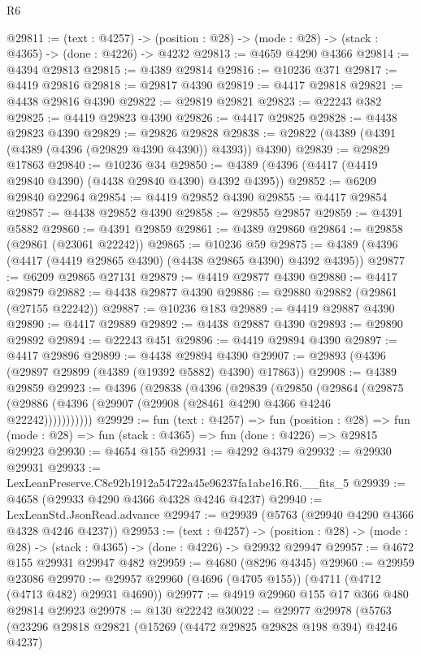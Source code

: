\begin{lexlean}{R6}
\begin{coremodule}
@29811 := (text : @4257) ->
  (position : @28) -> (mode : @28) -> (stack : @4365) -> (done : @4226) -> @4232
@29813 := @4659 @4290 @4366
@29814 := @4394 @29813
@29815 := @4389 @29814
@29816 := @10236 @371
@29817 := @4419 @29816
@29818 := @29817 @4390
@29819 := @4417 @29818
@29821 := @4438 @29816 @4390
@29822 := @29819 @29821
@29823 := @22243 @382
@29825 := @4419 @29823 @4390
@29826 := @4417 @29825
@29828 := @4438 @29823 @4390
@29829 := @29826 @29828
@29838 := @29822 (@4389 (@4391 (@4389 (@4396 (@29829 @4390 @4390)) @4393)) @4390)
@29839 := @29829 @17863
@29840 := @10236 @34
@29850 := @4389 (@4396 (@4417 (@4419 @29840 @4390) (@4438 @29840 @4390) @4392 @4395))
@29852 := @6209 @29840 @22964
@29854 := @4419 @29852 @4390
@29855 := @4417 @29854
@29857 := @4438 @29852 @4390
@29858 := @29855 @29857
@29859 := @4391 @5882
@29860 := @4391 @29859
@29861 := @4389 @29860
@29864 := @29858 (@29861 (@23061 @22242))
@29865 := @10236 @59
@29875 := @4389 (@4396 (@4417 (@4419 @29865 @4390) (@4438 @29865 @4390) @4392 @4395))
@29877 := @6209 @29865 @27131
@29879 := @4419 @29877 @4390
@29880 := @4417 @29879
@29882 := @4438 @29877 @4390
@29886 := @29880 @29882 (@29861 (@27155 @22242))
@29887 := @10236 @183
@29889 := @4419 @29887 @4390
@29890 := @4417 @29889
@29892 := @4438 @29887 @4390
@29893 := @29890 @29892
@29894 := @22243 @451
@29896 := @4419 @29894 @4390
@29897 := @4417 @29896
@29899 := @4438 @29894 @4390
@29907 := @29893 (@4396 (@29897 @29899 (@4389 (@19392 @5882) @4390) @17863))
@29908 := @4389 @29859
@29923 := @4396
    (@29838
      (@4396
        (@29839
          (@29850
            (@29864
              (@29875 (@29886 (@4396 (@29907 (@29908 (@28461 @4290 @4366 @4246 @22242)))))))))))
@29929 := fun (text : @4257) =>
  fun (position : @28) =>
  fun (mode : @28) => fun (stack : @4365) => fun (done : @4226) => @29815 @29923
@29930 := @4654 @155
@29931 := @4292 @4379
@29932 := @29930 @29931
@29933 := LexLeanPreserve.C8c92b1912a54722a45e96237fa1abe16.R6.__fits_5
@29939 := @4658 (@29933 @4290 @4366 @4328 @4246 @4237)
@29940 := LexLeanStd.JsonRead.advance
@29947 := @29939 (@5763 (@29940 @4290 @4366 @4328 @4246 @4237))
@29953 := (text : @4257) ->
  (position : @28) -> (mode : @28) -> (stack : @4365) -> (done : @4226) -> @29932 @29947
@29957 := @4672 @155 @29931 @29947 @482
@29959 := @4680 (@8296 @4345)
@29960 := @29959 @23086
@29970 := @29957 @29960 (@4696 (@4705 @155)) (@4711 (@4712 (@4713 @482) @29931 @4690))
@29977 := @4919 @29960 @155 @17 @366 @480 @29814 @29923
@29978 := @130 @22242
@30022 := @29977
    @29978
    (@5763
      (@23296
        @29818
        @29821
        (@15269 (@4472 @29825 @29828 @198 @394) @4246 @4237)

\end{coremodule}
\end{lexlean}
